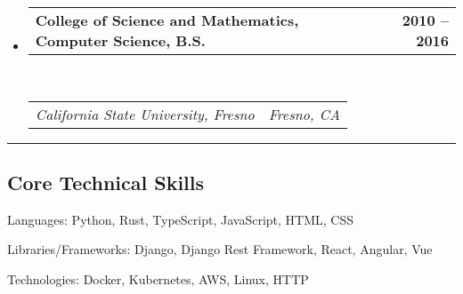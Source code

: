 \documentclass[10pt,letterpaper]{article}
\makeatletter
\newenvironment{indentsection}[1]%
{\begin{list}{}%
    {\setlength{\leftmargin}{#1}}%
    \item[]%
}
{\end{list}}
\newcommand{\headerrow}[2]
{\begin{tabular*}{\linewidth}{l@{\extracolsep{\fill}}r}
#1 &
#2 \\
\end{tabular*}}
\makeatother
\begin{document}
\begin{itemize}
    \parskip=0.1em

    \item
          \headerrow
          {\textbf{College of Science and Mathematics, Computer Science, B.S.}}
          {\textbf{2010 -- 2016}}
          \\
          \headerrow
          {\emph{California State University, Fresno}}
          {\emph{Fresno, CA}}

\end{itemize}


\hrule
\vspace{-0.4em}
\subsection*{Core Technical Skills}

\begin{indentsection}{\parindent}
    \begin{description*}
        \item[Languages:]
            Python, Rust, TypeScript, JavaScript, HTML, CSS
        \item[Libraries/Frameworks:]
            Django, Django Rest Framework, React, Angular, Vue
        \item[Technologies:]
            Docker, Kubernetes, AWS, Linux, HTTP
    \end{description*}
\end{indentsection}
\end{document}
